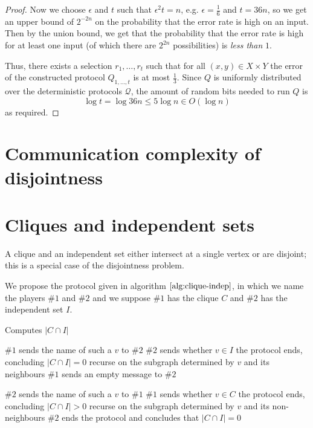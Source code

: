 \documentclass[letterpaper,11pt]{article}
\begin{document}
\begin{proof}
    Now we choose $\epsilon$ and $t$ such that $\epsilon^2 t = n$, e.g.
    $\epsilon = \frac{1}{6}$ and $t = 36n$, so we get an upper bound of
    $2^{-2n}$ on the probability that the error rate is high on an input. Then
    by the union bound, we get that the probability that the error rate is high
    for at least one input (of which there are $2^{2n}$ possibilities) is
    \emph{less than} $1$.

    Thus, there exists a selection $r_1, \ldots, r_t$ such that for all $(x, y)
    \in X \times Y$ the error of the constructed protocol $Q_{1,\ldots,t}$ is
    at most $\frac{1}{3}$. Since $Q$ is uniformly distributed over the
    deterministic protocols $\mathcal{Q}$, the amount of random bits needed to
    run $Q$ is
    \begin{equation*}
        \log t = \log {36n} \leq 5 \log n \in O(\log n)
    \end{equation*}
    as required.
\end{proof}

\section{Communication complexity of disjointness}

\section{Cliques and independent sets}

A clique and an independent set either intersect at a single vertex or are
disjoint; this is a special case of the disjointness problem.

We propose the protocol given in algorithm $\ref{alg:clique-indep}$, in which
we name the players $\#1$ and $\#2$ and we suppose $\#1$ has the clique $C$ and
$\#2$ has the independent set $I$.

\begin{algorithm}
    \caption{Computes $|C \cap I|$}
    \begin{algorithmic}
            \State $\#1$ sends the name of such a $v$ to $\#2$
            \State $\#2$ sends whether $v \in I$
                \State the protocol ends, concluding $|C \cap I| = 0$
            \Else
                \State recurse on the subgraph determined by $v$ and its
                neighbours
            \EndIf
        \Else
            \State $\#1$ sends an empty message to $\#2$
        \EndIf

            \State $\#2$ sends the name of such a $v$ to $\#1$
            \State $\#1$ sends whether $v \in C$
                \State the protocol ends, concluding $|C \cap I| > 0$
            \Else
                \State recurse on the subgraph determined by $v$ and its
                non-neighbours
            \EndIf
        \Else
            \State $\#2$ ends the protocol and concludes that $|C \cap I| = 0$
        \EndIf
    \end{algorithmic}
    \label{alg:clique-indep}
\end{algorithm}
\end{document}
